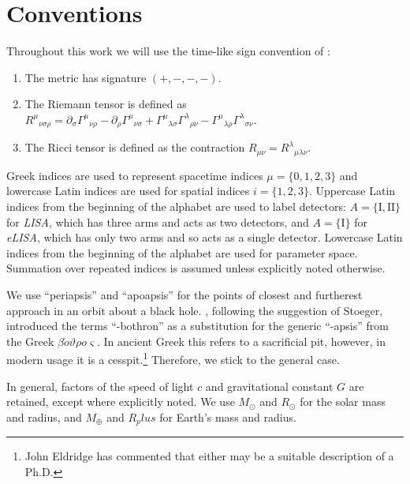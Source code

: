 \chapter{Conventions}

Throughout this work we will use the time-like sign convention of \citet{Landau1975}:
\begin{enumerate}
\item The metric has signature $(+,-,-,-)$.
\item The Riemann tensor is defined as ${R^\mu}_{\nu\sigma\rho} = \partial_\sigma {\Gamma^\mu}_{\nu\rho} - \partial_\rho {\Gamma^\mu}_{\nu\sigma} + {\Gamma^\mu}_{\lambda\sigma}{\Gamma^\lambda}_{\rho\nu} - {\Gamma^\mu}_{\lambda\rho}{\Gamma^\lambda}_{\sigma\nu}$.
\item The Ricci tensor is defined as the contraction $R_{\mu\nu} = {R^\lambda}_{\mu\lambda\nu}$.
\end{enumerate}
Greek indices are used to represent spacetime indices $\mu = \{0,1,2,3\}$ %
and lowercase Latin indices are used for spatial indices $i = \{1,2,3\}$. Uppercase Latin indices from the beginning of the alphabet are used to label detectors: $A = \{\mathrm{I}, \mathrm{II}\}$ for \textit{LISA}, which has three arms and acts as two detectors, and $A = \{\mathrm{I}\}$ for \textit{eLISA}, which has only two arms and so acts as a single detector. Lowercase Latin indices from the beginning of the alphabet are used for parameter space. Summation over repeated indices is assumed unless explicitly noted otherwise.

We use ``periapsis'' and ``apoapsis'' for the points of closest and furtherest approach in an orbit about a black hole. \citet{Frank1976}, following the suggestion of Stoeger, introduced the terms ``-bothron'' as a substitution for the generic ``-apsis'' from the Greek {$\mathit{\beta\acute{o}\vartheta\rho o \varsigma}$}. In ancient Greek this refers to a sacrificial pit, however, in modern usage it is a cesspit.\footnote{John Eldridge has commented that either may be a suitable description of a Ph.D.} Therefore, we stick to the general case.

In general, factors of the speed of light $c$ and gravitational constant $G$ are retained, except where explicitly noted. We use $M_\odot$ and $R_\odot$ for the solar mass and radius, and $M_\oplus$ and $R_plus$ for Earth's mass and radius.
